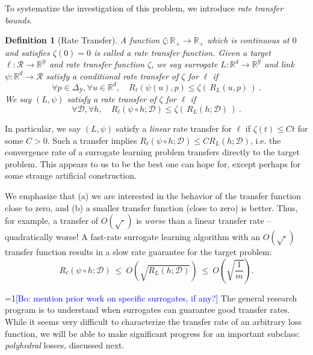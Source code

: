 \documentclass{article}
\newtheorem{definition}{Definition}
\newcommand{\Comments}{1}
\newcommand{\mynote}[2]{\ifnum\Comments=1\textcolor{#1}{#2}\fi}
\newcommand{\bo}[1]{\mynote{blue}{[Bo: #1]}}
\newcommand{\reals}{\mathbb{R}}
\newcommand{\simplex}{\Delta_\Y}
\newcommand{\D}{\mathcal{D}}
\newcommand{\R}{\mathcal{R}}
\newcommand{\Y}{\mathcal{Y}}
\begin{document}
To systematize the investigation of this problem, we introduce \emph{rate transfer bounds}.

\begin{definition}[Rate Transfer]\label{def:transfer}
  A function $\zeta : \reals_+ \to \reals_+$ which is continuous at $0$ and satisfies $\zeta(0) = 0$ is called a \emph{rate transfer function.}
	Given a target $\ell:\R\to\reals^\Y$ and rate transfer function $\zeta$, we say surrogate $L:\reals^d\to\reals^\Y$ and link $\psi : \reals^d \to \R$ satisfy a \emph{conditional rate transfer} of $\zeta$ for $\ell$ if
  \begin{equation}
    \label{eq:conditional-transfer}
    \forall p\in\simplex, \forall u\in\reals^d, \quad R_\ell(\psi(u),p) \leq \zeta(\, R_L(u,p) \,)~.
  \end{equation}
  We say $(L,\psi)$ satisfy a \emph{rate transfer} of $\zeta$ for $\ell$ if
  \begin{equation}
    \label{eq:transfer}
    \forall \D, \forall h, \quad R_\ell(\psi \circ h;\D) \leq \zeta(\, R_L(h;\D) \,)~.
  \end{equation}
\end{definition}
In particular, we say $(L,\psi)$ satisfy a \emph{linear} rate transfer for $\ell$ if $\zeta(t) \leq Ct$ for some $C > 0$.
Such a transfer implies $R_{\ell}(\psi \circ h;\D) \leq C R_L(h;\D)$, i.e. the convergence rate of a surrogate learning problem transfers directly to the target problem.
This appears to us to be the best one can hope for, except perhaps for some strange artificial construction.

We emphasize that (a) we are interested in the behavior of the transfer function close to zero, and (b) a smaller transfer function (close to zero) is better.
Thus, for example, a transfer of $O(\sqrt{\cdot})$ is \emph{worse} than a linear transfer rate -- quadratically worse!
A fast-rate surrogate learning algorithm with an $O(\sqrt{\cdot})$ transfer function results in a slow rate guarantee for the target problem:
  \[ R_{\ell}(\psi \circ h; \D) ~\leq~ O\left(\sqrt{R_L(h;\D)}\right) ~\leq~ O\left(\sqrt{\frac{1}{m}}\right) . \]

\bo{mention prior work on specific surrogates, if any?}
The general research program is to understand when surrogates can guarantee good transfer rates.
While it seems very difficult to characterize the transfer rate of an arbitrary loss function, we will be able to make significant progress for an important subclass: \emph{polyhedral} losses, discussed next.
\end{document}
